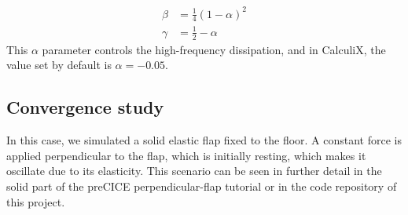 \documentclass[
  english,        %
  font=times,     %
  onecolumn,      %
]{tumarticle}
\begin{document}
\begin{align}
    \beta &= \frac{1}{4}(1 - \alpha)^2 \\
    \gamma &= \frac{1}{2} - \alpha
\end{align}
This $\alpha$ parameter controls the high-frequency dissipation, and in CalculiX, the value set by default is $\alpha=-0.05$.

\subsection{Convergence study} \label{sec:convstudycalc}
In this case, we simulated a solid elastic flap fixed to the floor. A constant force is applied perpendicular to the flap, which is initially resting, which makes it oscillate due to its elasticity. This scenario can be seen in further detail in the solid part of the preCICE perpendicular-flap tutorial \cite{perpendicularFlap} or in the code repository of this project.
\end{document}
